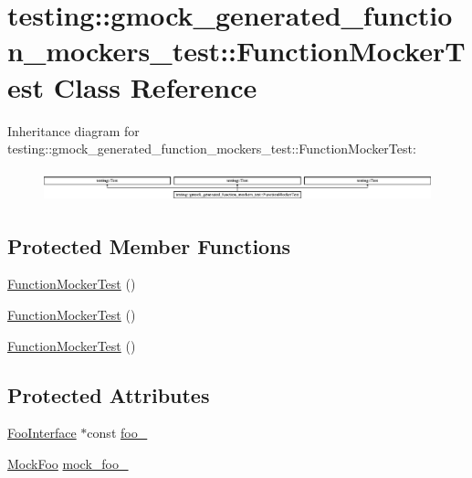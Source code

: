 \hypertarget{classtesting_1_1gmock__generated__function__mockers__test_1_1_function_mocker_test}{}\section{testing\+::gmock\+\_\+generated\+\_\+function\+\_\+mockers\+\_\+test\+::Function\+Mocker\+Test Class Reference}
\label{classtesting_1_1gmock__generated__function__mockers__test_1_1_function_mocker_test}
Inheritance diagram for testing\+::gmock\+\_\+generated\+\_\+function\+\_\+mockers\+\_\+test\+::Function\+Mocker\+Test\+:\begin{figure}[H]
\begin{center}
\leavevmode
\includegraphics[height=0.899598cm]{db/dab/classtesting_1_1gmock__generated__function__mockers__test_1_1_function_mocker_test}
\end{center}
\end{figure}
\subsection*{Protected Member Functions}
\begin{DoxyCompactItemize}
\item 
\mbox{\hyperlink{classtesting_1_1gmock__generated__function__mockers__test_1_1_function_mocker_test_a22216ac0755e96e21c0f76068ff64f03}{Function\+Mocker\+Test}} ()
\item 
\mbox{\hyperlink{classtesting_1_1gmock__generated__function__mockers__test_1_1_function_mocker_test_a22216ac0755e96e21c0f76068ff64f03}{Function\+Mocker\+Test}} ()
\item 
\mbox{\hyperlink{classtesting_1_1gmock__generated__function__mockers__test_1_1_function_mocker_test_a22216ac0755e96e21c0f76068ff64f03}{Function\+Mocker\+Test}} ()
\end{DoxyCompactItemize}
\subsection*{Protected Attributes}
\begin{DoxyCompactItemize}
\item 
\mbox{\hyperlink{classtesting_1_1gmock__generated__function__mockers__test_1_1_foo_interface}{Foo\+Interface}} $\ast$const \mbox{\hyperlink{classtesting_1_1gmock__generated__function__mockers__test_1_1_function_mocker_test_ada579197c06cf3f33e1d2a0aea4f20b7}{foo\+\_\+}}
\item 
\mbox{\hyperlink{classtesting_1_1gmock__generated__function__mockers__test_1_1_mock_foo}{Mock\+Foo}} \mbox{\hyperlink{classtesting_1_1gmock__generated__function__mockers__test_1_1_function_mocker_test_a265659f07a0e75152ab295add4769585}{mock\+\_\+foo\+\_\+}}
\end{DoxyCompactItemize}
